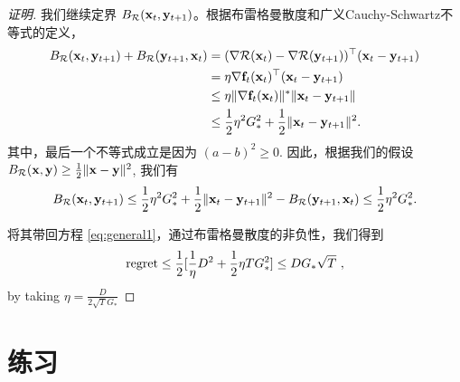 \begin{proof}[证明]
我们继续定界 $B_{\mathcal R}(\mathbf x_t,\mathbf y_{t+1})$。根据布雷格曼散度和广义Cauchy-Schwartz不等式的定义，
\begin{align*}
 B_{\mathcal R}(\mathbf x_t,\mathbf y_{t+1}) + B_{\mathcal R}(\mathbf y_{t+1},\mathbf x_t) &= (\nabla \mathcal R(\mathbf x_t) - \nabla \mathcal R(\mathbf y_{t+1}))^\top (\mathbf x_t - \mathbf y_{t+1}) \\
 &=  \eta \nabla \mathbf f_{t}(\mathbf x_t)^\top(\mathbf x_t - \mathbf y_{t+1}) \\
 & \leq \eta \| \nabla \mathbf f_{t}(\mathbf x_t) \|^* \| \mathbf x_t - \mathbf y_{t+1} \| \\
 &\leq  \frac{1}{2} \eta^2 G_*^{ 2} + \frac{1}{2} \|\mathbf x_t - \mathbf y_{t+1}\|^2.
\end{align*}
其中，最后一个不等式成立是因为 $(a-b)^2 \geq 0$. 
因此，根据我们的假设 $B_{\mathcal R}(\mathbf x,\mathbf y) \geq \frac{1}{2} \|\mathbf x-\mathbf y\|^2$, 我们有
$$ B_{\mathcal R}(\mathbf x_t,\mathbf y_{t+1}) \leq \frac{1}{2} \eta^2 G_*^2 + \frac{1}{2} \|\mathbf x_t -
\mathbf y_{t+1}\|^2 - B_{\mathcal R}(\mathbf y_{t+1},\mathbf x_t) \leq \frac{1}{2} \eta^2 G^2_*. $$

将其带回方程 \eqref{eq:general1}，通过布雷格曼散度的非负性，我们得到
$$ \mathrm{{regret}} \leq  \frac{1}{2} [\frac{1}{\eta} D^2 + \frac{1}{2} \eta T G_{*}^{2} ] \leq  D G_* \sqrt{T} \ ,  $$
by taking $\eta = \frac{D}{2 \sqrt{T} G_*}$

\end{proof}





\newpage
\section{
	练习
	}

